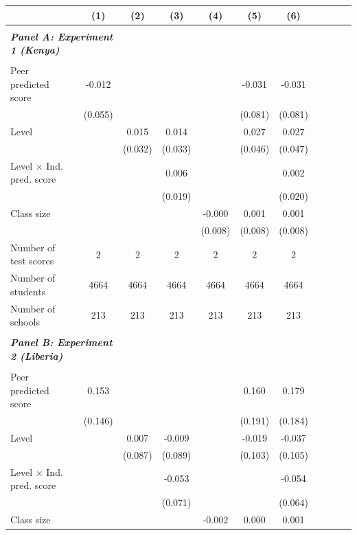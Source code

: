 \begin{center} 
\caption{\small Effect on test scores} 
\label{tab:descriptives} 
\begin{scriptsize}
\begin{threeparttable}
\begin{tabular} {@{} l l c c c c c c c c c c  @{}} \toprule \toprule
& &(1)&(2)&(3)&(4)&(5)&(6) \\ \midrule 
\\
\multicolumn{3}{l}{\textbf{\textit{Panel A: Experiment 1 (Kenya)}}} \\
\\
Peer predicted score &  & -0.012 &  &  &  & -0.031 & -0.031 \\
                 &  & (0.055) &  &  &  & (0.081) & (0.081) \\
Level &  &  & 0.015 & 0.014 &  & 0.027 & 0.027 \\
                 &  &  & (0.032) & (0.033) &  & (0.046) & (0.047) \\
Level $\times$ Ind. pred. score &  &  &  & 0.006 &  &  & 0.002 \\
                 &  &  &  & (0.019) &  &  & (0.020) \\
Class size &  &  &  &  & -0.000 & 0.001 & 0.001 \\
                 &  &  &  &  & (0.008) & (0.008) & (0.008) \\
\midrule
Number of test scores &  & 2 & 2 & 2 & 2 & 2 & 2 \\
Number of students &  & 4664 & 4664 & 4664 & 4664 & 4664 & 4664 \\
Number of schools &  & 213 & 213 & 213 & 213 & 213 & 213 \\
 \midrule
\\
\multicolumn{3}{l}{\textbf{\textit{Panel B: Experiment 2 (Liberia)}}} \\
\\
Peer predicted score &  & 0.153 &  &  &  & 0.160 & 0.179 \\
                 &  & (0.146) &  &  &  & (0.191) & (0.184) \\
Level &  &  & 0.007 & -0.009 &  & -0.019 & -0.037 \\
                 &  &  & (0.087) & (0.089) &  & (0.103) & (0.105) \\
Level $\times$ Ind. pred. score &  &  &  & -0.053 &  &  & -0.054 \\
                 &  &  &  & (0.071) &  &  & (0.064) \\
Class size &  &  &  &  & -0.002 & 0.000 & 0.001 \\

\end{tabular}
\end{threeparttable}
\end{scriptsize}
\end{center}
